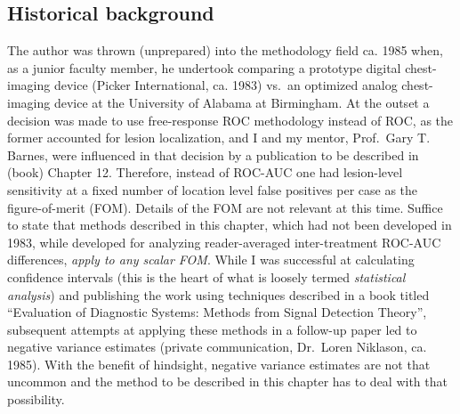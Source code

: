 \documentclass[
]{book}
\begin{document}
\hypertarget{historical-background}{%
\subsection{Historical background}\label{historical-background}}

The author was thrown (unprepared) into the methodology field ca. 1985 when, as a junior faculty member, he undertook comparing a prototype digital chest-imaging device (Picker International, ca. 1983) vs.~an optimized analog chest-imaging device at the University of Alabama at Birmingham. At the outset a decision was made to use free-response ROC methodology instead of ROC, as the former accounted for lesion localization, and I and my mentor, Prof.~Gary T. Barnes, were influenced in that decision by a publication \citep{bunch1977free} to be described in (book) Chapter 12. Therefore, instead of ROC-AUC one had lesion-level sensitivity at a fixed number of location level false positives per case as the figure-of-merit (FOM). Details of the FOM are not relevant at this time. Suffice to state that methods described in this chapter, which had not been developed in 1983, while developed for analyzing reader-averaged inter-treatment ROC-AUC differences, \emph{apply to any scalar FOM}. While I was successful at calculating confidence intervals (this is the heart of what is loosely termed \emph{statistical analysis}) and publishing the work \citep{Chakraborty1986DigitalVsConv} using techniques described in a book \citep{RN412} titled ``Evaluation of Diagnostic Systems: Methods from Signal Detection Theory'', subsequent attempts at applying these methods in a follow-up paper \citep{Niklason1986SimulatedPulmonary} led to negative variance estimates (private communication, Dr.~Loren Niklason, ca. 1985). With the benefit of hindsight, negative variance estimates are not that uncommon and the method to be described in this chapter has to deal with that possibility.
\end{document}
